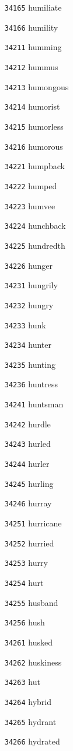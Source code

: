 \documentclass[twoside,11pt]{article}
\begin{document}
\begin{multicols}{5}
\begin{enumerate}
\item[\texttt{34165}] humiliate
\item[\texttt{34166}] humility
\item[\texttt{34211}] humming
\item[\texttt{34212}] hummus
\item[\texttt{34213}] humongous
\item[\texttt{34214}] humorist
\item[\texttt{34215}] humorless
\item[\texttt{34216}] humorous
\item[\texttt{34221}] humpback
\item[\texttt{34222}] humped
\item[\texttt{34223}] humvee
\item[\texttt{34224}] hunchback
\item[\texttt{34225}] hundredth
\item[\texttt{34226}] hunger
\item[\texttt{34231}] hungrily
\item[\texttt{34232}] hungry
\item[\texttt{34233}] hunk
\item[\texttt{34234}] hunter
\item[\texttt{34235}] hunting
\item[\texttt{34236}] huntress
\item[\texttt{34241}] huntsman
\item[\texttt{34242}] hurdle
\item[\texttt{34243}] hurled
\item[\texttt{34244}] hurler
\item[\texttt{34245}] hurling
\item[\texttt{34246}] hurray
\item[\texttt{34251}] hurricane
\item[\texttt{34252}] hurried
\item[\texttt{34253}] hurry
\item[\texttt{34254}] hurt
\item[\texttt{34255}] husband
\item[\texttt{34256}] hush
\item[\texttt{34261}] husked
\item[\texttt{34262}] huskiness
\item[\texttt{34263}] hut
\item[\texttt{34264}] hybrid
\item[\texttt{34265}] hydrant
\item[\texttt{34266}] hydrated

\end{enumerate}
\end{multicols}
\end{document}

